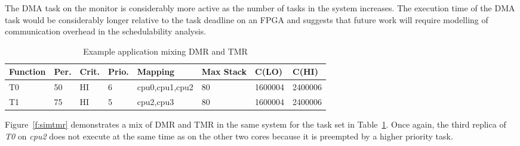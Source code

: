 	The DMA task on the monitor is considerably more active as the number of tasks in the system increases.
	The execution time of the DMA task would be considerably longer relative to the task deadline on an FPGA and suggests that future work will require modelling of communication overhead in the schedulability analysis.
	
	

\begin{table}[h]
\caption{Example application mixing DMR and TMR}
\centering
	\begin{tabular}{@{}llllllll@{}}
	Function & Per. & Crit. & Prio. & Mapping & Max Stack & C(LO) & C(HI) 	 \\
	
	\toprule
	T0 & 50 & HI & 6 & cpu0,cpu1,cpu2 & 80 & 1600004 & 2400006 \\
	T1 & 75 & HI & 5 & cpu2,cpu3 & 80 & 1600004 & 2400006 \\
	\end{tabular}
	
	
\label{t:tmr}
\end{table}

	Figure~\ref{f:simtmr} demonstrates a mix of DMR and TMR in the same system for the task set in Table~\ref{t:tmr}. 
	Once again, the third replica of \emph{T0} on \emph{cpu2} does not execute at the same time as on the other two cores because it is preempted by a higher priority task.






